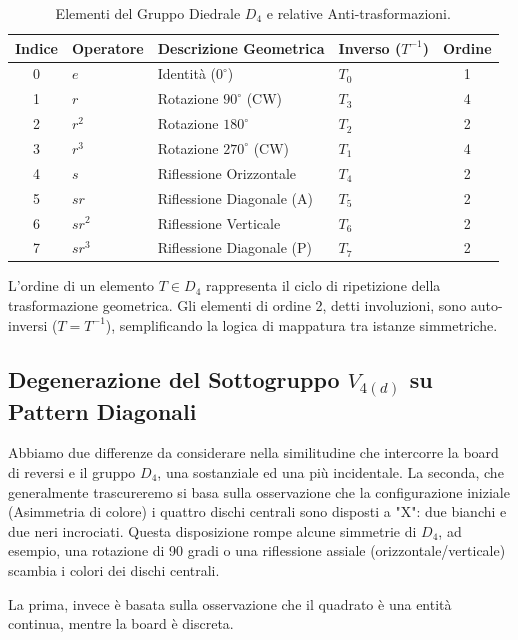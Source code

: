 \begin{table}[h]
\centering
\caption{Elementi del Gruppo Diedrale $D_4$ e relative Anti-trasformazioni.}
\label{tab:d4_inverses}
\begin{tabular}{@{}clllc@{}}
\hline
\textbf{Indice} & \textbf{Operatore} & \textbf{Descrizione Geometrica} & \textbf{Inverso ($T^{-1}$)} & \textbf{Ordine} \\ \hline
0 & $e$      & Identità ($0^\circ$)          & $T_0$ & 1 \\
1 & $r$      & Rotazione $90^\circ$ (CW)     & $T_3$ & 4 \\
2 & $r^2$    & Rotazione $180^\circ$         & $T_2$ & 2 \\
3 & $r^3$    & Rotazione $270^\circ$ (CW)    & $T_1$ & 4 \\
4 & $s$      & Riflessione Orizzontale       & $T_4$ & 2 \\
5 & $sr$     & Riflessione Diagonale (A)     & $T_5$ & 2 \\
6 & $sr^2$   & Riflessione Verticale         & $T_6$ & 2 \\
7 & $sr^3$   & Riflessione Diagonale (P)     & $T_7$ & 2 \\ \hline
\end{tabular}
\end{table}

L'ordine di un elemento \(T\in D_{4}\) rappresenta il ciclo di ripetizione della trasformazione geometrica.
Gli elementi di ordine 2, detti involuzioni, sono auto-inversi (\(T=T^{-1}\)), semplificando la logica di mappatura tra istanze simmetriche.

\subsection{Degenerazione del Sottogruppo $V_{4(d)}$ su Pattern Diagonali}
Abbiamo due differenze da considerare nella similitudine che intercorre la board di reversi e il gruppo $D_4$, una sostanziale ed una più incidentale.
La seconda, che generalmente trascureremo si basa sulla osservazione che la configurazione iniziale (Asimmetria di colore) i quattro dischi centrali sono disposti a "X": due bianchi e due neri incrociati.
Questa disposizione rompe alcune simmetrie di $D_4$, ad esempio, una rotazione di 90 gradi o una riflessione assiale (orizzontale/verticale) scambia i colori dei dischi centrali.

La prima, invece è basata sulla osservazione che il quadrato è una entità continua, mentre la board è discreta.

